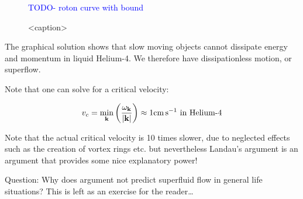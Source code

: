 \begin{figure}[htbp]
    \centering
    \textcolor{blue}{TODO- roton curve with bound}
    \caption{<caption>}
    \label{<label>}
\end{figure}

The graphical solution shows that slow moving objects cannot dissipate energy and momentum in liquid Helium-4. We therefore have dissipationless motion, or superflow.

Note that one can solve for a critical velocity:

\begin{equation}
    v_c = \min_\v{k}\left(\frac{\omega_\v{k}}{\abs{\v{k}}}\right) \approx 1\si{cm.s^{-1}} \text{ in Helium-4}
\end{equation}

Note that the actual critical velocity is 10 times slower, due to neglected effects such as the creation of vortex rings etc. but nevertheless Landau's argument is an argument that provides some nice explanatory power!

Question: Why does argument not predict superfluid flow in general life situations? This is left as an exercise for the reader\dots

